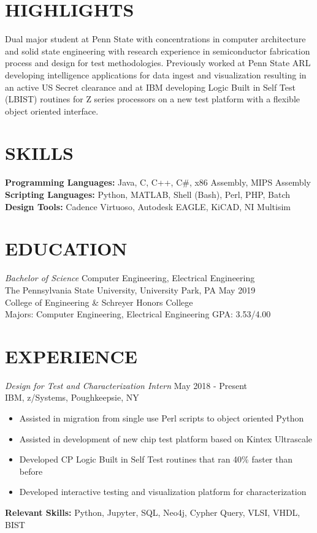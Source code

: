 \documentclass[line,margin]{res}
\begin{document}
	\address{235 S. Buckhout St. State College, PA 16801}
	\address{(484) 904-2099}
	
	\begin{resume}
		\section{HIGHLIGHTS} Dual major student at Penn State with concentrations in computer architecture and solid state engineering with research experience in semiconductor fabrication process and design for test methodologies.  Previously worked at Penn State ARL developing intelligence applications for data ingest and visualization resulting in an active US Secret clearance and at IBM developing Logic Built in Self Test (LBIST) routines for Z series processors on a new test platform with a flexible object oriented interface.
		
		\section{SKILLS}
		\textbf{Programming Languages:} Java, C, C++, C\#, x86 Assembly, MIPS Assembly\\
		\textbf{Scripting Languages:} Python, MATLAB, Shell (Bash), Perl, PHP, Batch\\
		\textbf{Design Tools:} Cadence Virtuoso, Autodesk EAGLE, KiCAD, NI Multisim
		
		\section{EDUCATION}{\sl Bachelor of Science} Computer Engineering, Electrical Engineering \\
		The Pennsylvania State University, University Park, PA \hfill May 2019\\
		College of Engineering \& Schreyer Honors College\\
		Majors: Computer Engineering, Electrical Engineering \hfill GPA: 3.53/4.00
		
		\section{EXPERIENCE}{\sl Design for Test and Characterization Intern} \hfill May 2018 - Present\\
		IBM, z/Systems, Poughkeepsie, NY
		\begin{itemize}  \itemsep -2pt
			\item Assisted in migration from single use Perl scripts to object oriented Python
			\item Assisted in development of new chip test platform based on Kintex Ultrascale
			\item Developed CP Logic Built in Self Test routines that ran 40\% faster than before
			\item Developed interactive testing and visualization platform for characterization
			\vspace*{-\baselineskip}		
		\end{itemize}
		\textbf{Relevant Skills:} Python, Jupyter, SQL, Neo4j, Cypher Query, VLSI, VHDL, BIST
		

\end{resume}
\end{document}
